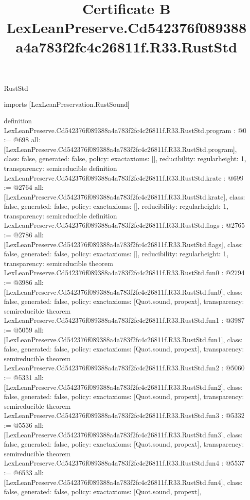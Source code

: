 \begin{lexlean}{RustStd}
\title{Certificate B LexLeanPreserve.Cd542376f089388a4a783f2fc4c26811f.R33.RustStd}
\begin{coremodule}
imports [LexLeanPreservation.RustSound]

definition LexLeanPreserve.Cd542376f089388a4a783f2fc4c26811f.R33.RustStd.program : @0 := @698 {
  all: [LexLeanPreserve.Cd542376f089388a4a783f2fc4c26811f.R33.RustStd.program],
  class: false,
  generated: false,
  policy: exact{axioms: []},
  reducibility: regular{height: 1},
  transparency: semireducible
}
definition LexLeanPreserve.Cd542376f089388a4a783f2fc4c26811f.R33.RustStd.krate : @699 := @2764 {
  all: [LexLeanPreserve.Cd542376f089388a4a783f2fc4c26811f.R33.RustStd.krate],
  class: false,
  generated: false,
  policy: exact{axioms: []},
  reducibility: regular{height: 1},
  transparency: semireducible
}
definition LexLeanPreserve.Cd542376f089388a4a783f2fc4c26811f.R33.RustStd.flags : @2765 := @2786 {
  all: [LexLeanPreserve.Cd542376f089388a4a783f2fc4c26811f.R33.RustStd.flags],
  class: false,
  generated: false,
  policy: exact{axioms: []},
  reducibility: regular{height: 1},
  transparency: semireducible
}
theorem LexLeanPreserve.Cd542376f089388a4a783f2fc4c26811f.R33.RustStd.fun0 : @2794 := @3986 {
  all: [LexLeanPreserve.Cd542376f089388a4a783f2fc4c26811f.R33.RustStd.fun0],
  class: false,
  generated: false,
  policy: exact{axioms: [Quot.sound, propext]},
  transparency: semireducible
}
theorem LexLeanPreserve.Cd542376f089388a4a783f2fc4c26811f.R33.RustStd.fun1 : @3987 := @5059 {
  all: [LexLeanPreserve.Cd542376f089388a4a783f2fc4c26811f.R33.RustStd.fun1],
  class: false,
  generated: false,
  policy: exact{axioms: [Quot.sound, propext]},
  transparency: semireducible
}
theorem LexLeanPreserve.Cd542376f089388a4a783f2fc4c26811f.R33.RustStd.fun2 : @5060 := @5331 {
  all: [LexLeanPreserve.Cd542376f089388a4a783f2fc4c26811f.R33.RustStd.fun2],
  class: false,
  generated: false,
  policy: exact{axioms: [Quot.sound, propext]},
  transparency: semireducible
}
theorem LexLeanPreserve.Cd542376f089388a4a783f2fc4c26811f.R33.RustStd.fun3 : @5332 := @5536 {
  all: [LexLeanPreserve.Cd542376f089388a4a783f2fc4c26811f.R33.RustStd.fun3],
  class: false,
  generated: false,
  policy: exact{axioms: [Quot.sound, propext]},
  transparency: semireducible
}
theorem LexLeanPreserve.Cd542376f089388a4a783f2fc4c26811f.R33.RustStd.fun4 : @5537 := @6533 {
  all: [LexLeanPreserve.Cd542376f089388a4a783f2fc4c26811f.R33.RustStd.fun4],
  class: false,
  generated: false,
  policy: exact{axioms: [Quot.sound, propext]},
}
\end{coremodule}
\end{lexlean}
